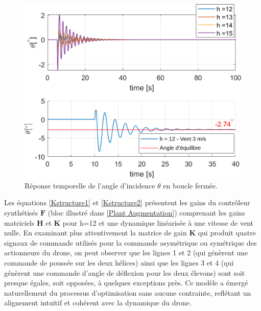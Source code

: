 \begin{figure}[hbt]
    \centering
    \includegraphics[width=0.7\columnwidth]{figures/windThetafinalhopeCrop.png}
    \caption{Réponse temporelle de l'angle d'incidence $\theta$ en boucle fermée.}
    \label{thetanowind}
\end{figure}

Les équations \eqref{Kstructure1} et \eqref{Kstructure2} présentent les gains du contrôleur synthétisés $\boldsymbol{F}$ (bloc illustré dans \ref{Plant Augmentation}) comprenant les gains matriciels $\boldsymbol{H}$ et $\boldsymbol{K}$ pour h=12 et une dynamique linéarisée à une vitesse de vent nulle. En examinant plus attentivement la matrice de gain $\boldsymbol{K}$ qui produit quatre signaux de commande utilisés pour la commande asymétrique ou symétrique des actionneurs du drone, on peut observer que les lignes 1 et 2 (qui génèrent une commande de poussée sur les deux hélices) ainsi que les lignes 3 et 4 (qui génèrent une commande d'angle de déflexion pour les deux élevons) sont soit presque égales, soit opposées, à quelques exceptions près. Ce modèle a émergé naturellement du processus d'optimisation sans aucune contrainte, reflétant un alignement intuitif et cohérent avec la dynamique du drone.

